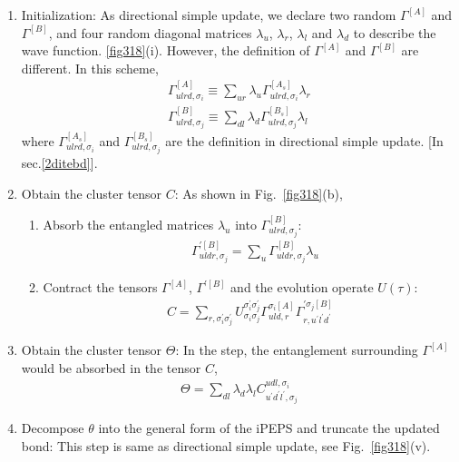 \begin{enumerate}
	\item Initialization: As directional simple update, we declare two random $\Gamma^{[A]}$ and $\Gamma^{[B]}$, and four random diagonal matrices $\lambda_{u}$, $\lambda_{r}$, $\lambda_{l}$ and $\lambda_{d}$ to describe the wave function. \ref{fig318}(i). However, the definition of $\Gamma^{[A]}$ and $\Gamma^{[B]}$ are different. In this scheme,
		\begin{align}
			\Gamma^{[A]}_{ulrd,\sigma_i} \equiv \sum_{ur}{\lambda_{u} \Gamma^{[A_s]}_{ulrd,\sigma_i} \lambda_{r}} \\
			\Gamma^{[B]}_{ulrd,\sigma_j} \equiv \sum_{dl}{\lambda_{d} \Gamma^{[B_s]}_{ulrd,\sigma_j} \lambda_{l}}
		\end{align}
		where $\Gamma^{[A_s]}_{ulrd,\sigma_i}$ and $\Gamma^{[B_s]}_{ulrd,\sigma_j}$ are the definition in directional simple update. [In sec.\ref{2ditebd}].
	\item Obtain the cluster tensor $C$: As shown in Fig.~\ref{fig318}(b),
			\begin{enumerate}
				\item Absorb the entangled matrices $\lambda_{u}$ into  $\Gamma^{[B]}_{ulrd,\sigma_j}$:
					\begin{align}
						&\Gamma^{\prime [B]}_{uldr, \sigma_j} = \sum_{u}{\Gamma^{[B]}_{uldr,\sigma_j} \lambda_{u}}
					\end{align}
				\item Contract the tensors $\Gamma^{[A]}$, $\Gamma^{\prime [B]}$ and the evolution operate $U(\tau)$: 
					\begin{align}
						C = \sum_{r,\sigma_i^{\prime}\sigma_j^{\prime}}{U^{\sigma_i^{\prime}\sigma_j^{\prime}}_{\sigma_i\sigma_j} \Gamma^{\sigma_i [A]}_{uld,r} \Gamma^{\prime \sigma_j[B]}_{r,u^{\prime} l^{\prime} d^{\prime}}}
					\end{align}
			\end{enumerate}
		\item Obtain the cluster tensor $\Theta$: In the step, the entanglement surrounding $\Gamma^{[A]}$ would be absorbed in the tensor $C$,
			\begin{align}
				\Theta = \sum_{dl}{\lambda_{d} \lambda_{l} C^{udl,\sigma_i}_{u^{\prime}d^{\prime}l^{\prime},\sigma_j}}
			\end{align}
		\item Decompose $\theta$ into the general form of the iPEPS and truncate the updated bond: This step is same as directional simple update, see Fig.~\ref{fig318}(v).

\end{enumerate}
